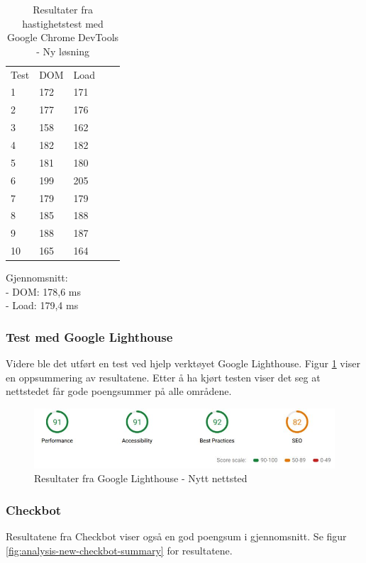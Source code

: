 \begin{table}[H]
\begin{center}
\begin{tabular}{lllll}
Test & DOM & Load &  &  \\
1 & 172 & 171 &  &  \\
2 & 177 & 176 &  &  \\
3 & 158 & 162 &  &  \\
4 & 182 & 182 &  &  \\
5 & 181 & 180 &  &  \\
6 & 199 & 205 &  &  \\
7 & 179 & 179 &  &  \\
8 & 185 & 188 &  &  \\
9 & 188 & 187 &  &  \\
10 & 165 & 164 &  &  \\
\end{tabular}
\end{center}
\caption{\label{tab:table-analysis-new-website}Resultater fra hastighetstest med Google Chrome DevTools - Ny løsning}
\end{table}

Gjennomsnitt:\\
- DOM: 178,6 ms\\
- Load: 179,4 ms

\subsubsection{Test med Google Lighthouse}
Videre ble det utført en test ved hjelp verktøyet Google Lighthouse. Figur \ref{fig:analysis-new-lightouse-summary} viser en oppsummering av resultatene. Etter å ha kjørt testen viser det seg at nettstedet får gode poengsummer på alle områdene. 

\begin{figure}[H]
    \centering
    \includegraphics[width=\textwidth]{bereket/Lighthouse-rapport-ny-nettsted.png}
    \caption{Resultater fra Google Lighthouse - Nytt nettsted}
    \label{fig:analysis-new-lightouse-summary}
\end{figure}

\subsubsection{Checkbot}
Resultatene fra Checkbot viser også en god poengsum i gjennomsnitt. Se figur \ref{fig:analysis-new-checkbot-summary} for resultatene.

